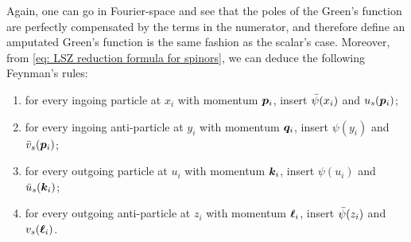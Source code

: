 Again, one can go in Fourier-space and see that the poles of the Green's function are perfectly compensated by the terms in the numerator, and therefore define an amputated Green's function is the same fashion as the scalar's case. Moreover, from \eqref{eq: LSZ reduction formula for spinors}, we can deduce the following Feynman's rules:
\begin{enumerate}
    \item for every ingoing particle at $x_i$ with momentum $\bm{p}_i$, insert $\bar{\psi}(x_i)$ and $u_s(\bm{p}_i)$;
    \item for every ingoing anti-particle at $y_i$ with momentum $\bm{q}_i$, insert $\psi(y_i)$ and $\bar{v}_s(\bm{p}_i)$;
    \item for every outgoing particle at $u_i$ with momentum $\bm{k}_i$, insert $\psi(u_i)$ and $\bar{u}_s(\bm{k}_i)$;
    \item for every outgoing anti-particle at $z_i$ with momentum $\bm{\ell}_i$, insert $\bar{\psi}(z_i)$ and $v_s(\bm{\ell}_i)$.
\end{enumerate}

